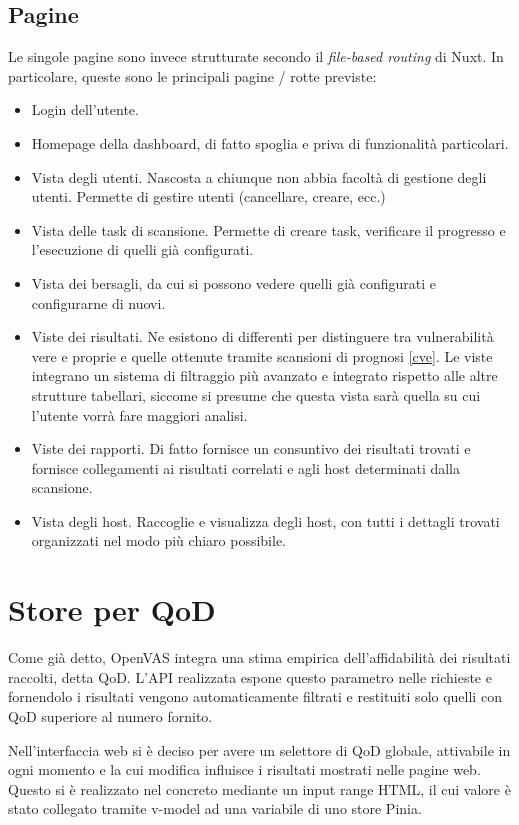 \subsection{Pagine}
Le singole pagine sono invece strutturate secondo il \emph{file-based routing} di Nuxt. In particolare, queste sono le principali pagine / rotte previste:
\begin{itemize}
    \item Login dell'utente.
    \item Homepage della dashboard, di fatto spoglia e priva di funzionalità particolari.
    \item Vista degli utenti. Nascosta a chiunque non abbia facoltà di gestione degli utenti. Permette di gestire utenti (cancellare, creare, ecc.)
    \item Vista delle task di scansione. Permette di creare task, verificare il progresso e l'esecuzione di quelli già configurati.
    \item Vista dei bersagli, da cui si possono vedere quelli già configurati e configurarne di nuovi.
    \item Viste dei risultati. Ne esistono di differenti per distinguere tra vulnerabilità vere e proprie e quelle ottenute tramite scansioni di prognosi \ref{cve}. Le viste integrano un sistema di filtraggio più avanzato e integrato rispetto alle altre strutture tabellari, siccome si presume che questa vista sarà quella su cui l'utente vorrà fare maggiori analisi.
    \item Viste dei rapporti. Di fatto fornisce un consuntivo dei risultati trovati e fornisce collegamenti ai risultati correlati e agli host determinati dalla scansione.
    \item Vista degli host. Raccoglie e visualizza degli host, con tutti i dettagli trovati organizzati nel modo più chiaro possibile.
\end{itemize}

\section{Store per QoD}
Come già detto, OpenVAS integra una stima empirica dell'affidabilità dei risultati raccolti, detta QoD. L'API realizzata espone questo parametro nelle richieste e fornendolo i risultati vengono automaticamente filtrati e restituiti solo quelli con QoD superiore al numero fornito.

Nell'interfaccia web si è deciso per avere un selettore di QoD globale, attivabile in ogni momento e la cui modifica influisce i risultati mostrati nelle pagine web. Questo si è realizzato nel concreto mediante un input range HTML, il cui valore è stato collegato tramite v-model ad una variabile di uno store Pinia.

